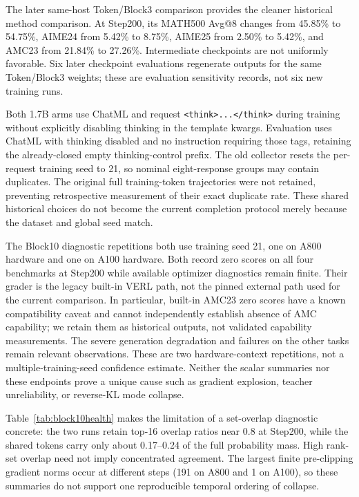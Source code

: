 The later same-host Token/Block3 comparison provides the cleaner historical method comparison. At Step200, its MATH500 Avg@8 changes from 45.85\% to 54.75\%, AIME24 from 5.42\% to 8.75\%, AIME25 from 2.50\% to 5.42\%, and AMC23 from 21.84\% to 27.26\%. Intermediate checkpoints are not uniformly favorable. Six later checkpoint evaluations regenerate outputs for the same Token/Block3 weights; these are evaluation sensitivity records, not six new training runs.

Both 1.7B arms use ChatML and request \texttt{<think>...</think>} during training without explicitly disabling thinking in the template kwargs. Evaluation uses ChatML with thinking disabled and no instruction requiring those tags, retaining the already-closed empty thinking-control prefix. The old collector resets the per-request training seed to 21, so nominal eight-response groups may contain duplicates. The original full training-token trajectories were not retained, preventing retrospective measurement of their exact duplicate rate. These shared historical choices do not become the current completion protocol merely because the dataset and global seed match.

The Block10 diagnostic repetitions both use training seed 21, one on A800 hardware and one on A100 hardware. Both record zero scores on all four benchmarks at Step200 while available optimizer diagnostics remain finite. Their grader is the legacy built-in VERL path, not the pinned external path used for the current comparison. In particular, built-in AMC23 zero scores have a known compatibility caveat and cannot independently establish absence of AMC capability; we retain them as historical outputs, not validated capability measurements. The severe generation degradation and failures on the other tasks remain relevant observations. These are two hardware-context repetitions, not a multiple-training-seed confidence estimate. Neither the scalar summaries nor these endpoints prove a unique cause such as gradient explosion, teacher unreliability, or reverse-KL mode collapse.

Table~\ref{tab:block10health} makes the limitation of a set-overlap diagnostic concrete: the two runs retain top-16 overlap ratios near 0.8 at Step200, while the shared tokens carry only about 0.17--0.24 of the full probability mass. High rank-set overlap need not imply concentrated agreement. The largest finite pre-clipping gradient norms occur at different steps (191 on A800 and 1 on A100), so these summaries do not support one reproducible temporal ordering of collapse.
\begin{table}[ht]
\centering\small
\caption{Retained Block10 diagnostic summaries. Entropies (nats), overlap ratio and intersection probability masses are measured at Step200; the last column is the maximum pre-clipping gradient norm over each run. Values come from the archived diagnostic report rather than a fresh training replication.}
\label{tab:block10health}

\end{table}

